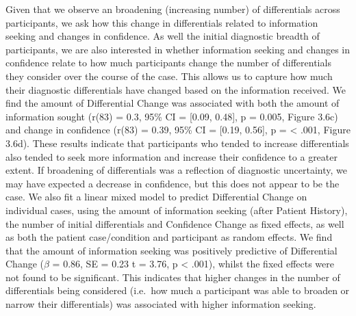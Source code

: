 \documentclass[a4paper, nobind]{templates/ociamthesis}
\begin{document}
\hfill\break
Given that we observe an broadening (increasing number) of differentials across participants, we ask how this change in differentials related to information seeking and changes in confidence. As well the initial diagnostic breadth of participants, we are also interested in whether information seeking and changes in confidence relate to how much participants change the number of differentials they consider over the course of the case. This allows us to capture how much their diagnostic differentials have changed based on the information received. We find the amount of Differential Change was associated with both the amount of information sought (r(83) = 0.3, 95\% CI = {[}0.09, 0.48{]}, p = 0.005, Figure 3.6c) and change in confidence (r(83) = 0.39, 95\% CI = {[}0.19, 0.56{]}, p = \textless{} .001, Figure 3.6d). These results indicate that participants who tended to increase differentials also tended to seek more information and increase their confidence to a greater extent. If broadening of differentials was a reflection of diagnostic uncertainty, we may have expected a decrease in confidence, but this does not appear to be the case. We also fit a linear mixed model to predict Differential Change on individual cases, using the amount of information seeking (after Patient History), the number of initial differentials and Confidence Change as fixed effects, as well as both the patient case/condition and participant as random effects. We find that the amount of information seeking was positively predictive of Differential Change (\(\beta\) = 0.86, SE = 0.23 t = 3.76, p \textless{} .001), whilst the fixed effects were not found to be significant. This indicates that higher changes in the number of differentials being considered (i.e.~how much a participant was able to broaden or narrow their differentials) was associated with higher information seeking.

\newpage
\end{document}
